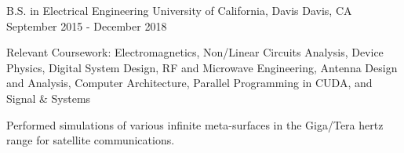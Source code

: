 


\begin{cventries}


\cventry
{B.S. in Electrical Engineering} %
{University of California, Davis} %
{Davis, CA} %
{September 2015 - December 2018} %
{ %
\begin{cvitems}
\item {Relevant Coursework: Electromagnetics, Non/Linear Circuits Analysis, Device Physics, Digital System Design, RF and Microwave Engineering, Antenna Design and Analysis, Computer Architecture, Parallel Programming in CUDA, and Signal \& Systems}
\item {Performed simulations of various infinite meta-surfaces in the Giga/Tera hertz range for satellite communications.}
\end{cvitems}
}


\end{cventries}